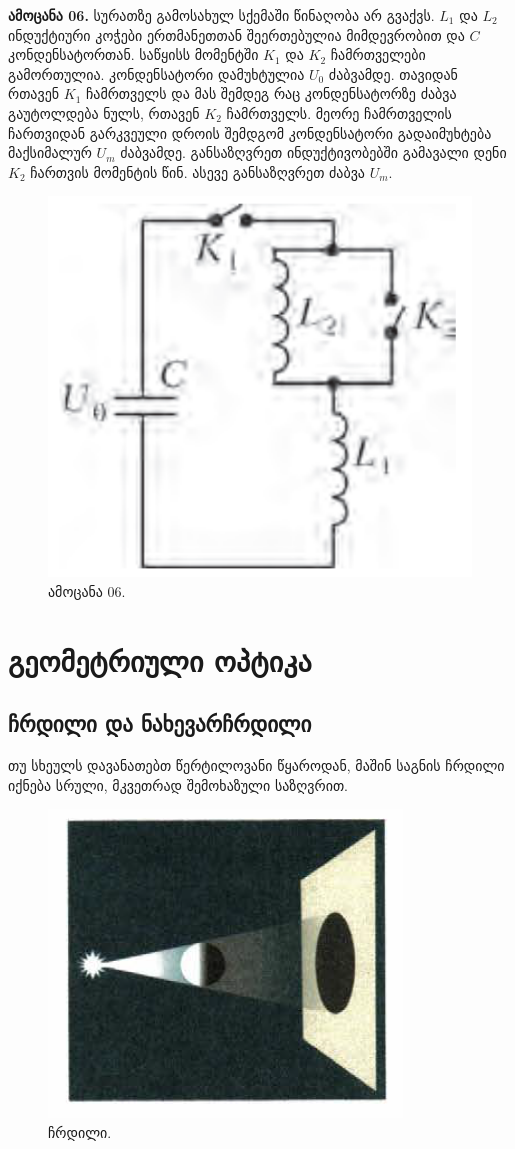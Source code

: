 \documentclass[a4paper]{book}
\begin{document}
\textbf{ამოცანა 06.} სურათზე გამოსახულ სქემაში წინაღობა არ გვაქვს. $L_1$ და $L_2$ ინდუქტიური კოჭები ერთმანეთთან შეერთებულია მიმდევრობით და $C$ კონდენსატორთან. საწყისს მომენტში $K_1$ და $K_2$ ჩამრთველები გამორთულია. კონდენსატორი დამუხტულია $U_0$ ძაბვამდე. თავიდან რთავენ $K_1$ ჩამრთველს და მას შემდეგ რაც კონდენსატორზე ძაბვა გაუტოლდება ნულს, რთავენ $K_2$ ჩამრთველს. მეორე ჩამრთველის ჩართვიდან გარკვეული დროის შემდგომ კონდენსატორი გადაიმუხტება მაქსიმალურ $U_m$ ძაბვამდე. განსაზღვრეთ ინდუქტივობებში გამავალი დენი $K_2$ ჩართვის მომენტის წინ. ასევე განსაზღვრეთ ძაბვა $U_m$.  
	\begin{figure}[H]
		\centering
		\includegraphics[width=0.2\columnwidth]{figures/Screenshot 2022-11-12 002156}
		\caption{ამოცანა 06.}
	\end{figure}

\chapter{გეომეტრიული ოპტიკა}
\section{ჩრდილი და ნახევარჩრდილი} 
თუ სხეულს დავანათებთ წერტილოვანი წყაროდან, მაშინ საგნის ჩრდილი იქნება სრული, მკვეთრად შემოხაზული საზღვრით. 
		\begin{figure}[H]
		   \centering
           \includegraphics[width=0.3\columnwidth]{figures/shadow}
           \caption{ჩრდილი.}
           \label{fig:shadow}
        \end{figure}
        
\end{document}
